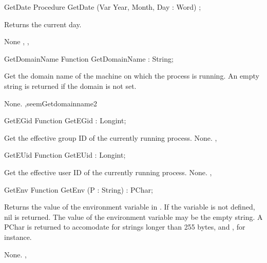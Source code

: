 \html{}
\begin{procedure}{GetDate}
\Declaration
Procedure GetDate  (Var Year, Month, Day : Word) ;

\Description

Returns the current day.

\Errors
None
\SeeAlso
{}, ,  
\end{procedure}
\html{}
\begin{function}{GetDomainName}
\Declaration
Function GetDomainName  : String;

\Description

Get the domain name of the machine on which the process is running.
An empty string is returned if the domain is not set.

\Errors
None.
\SeeAlso
 ,seem{Getdomainname}{2} 
\end{function}
\html{}
\begin{function}{GetEGid}
\Declaration
Function GetEGid  : Longint;

\Description
 Get the effective group ID of the currently running process.
\Errors
None.
\SeeAlso
{},  
\end{function}
\html{}
\begin{function}{GetEUid}
\Declaration
Function GetEUid  : Longint;

\Description
 Get the effective user ID of the currently running process.
\Errors
None.
\SeeAlso
{},  
\end{function}
\html{}
\begin{function}{GetEnv}
\Declaration
Function GetEnv (P : String) : PChar;

\Description
Returns the value of the environment variable in . If the variable is
not defined, nil is returned. The value of the environment variable may be
the empty string.
A PChar is returned to accomodate for strings longer than 255 bytes,
 and , for instance.

\Errors
None.
\SeeAlso
{},  
\end{function}
\html{}
